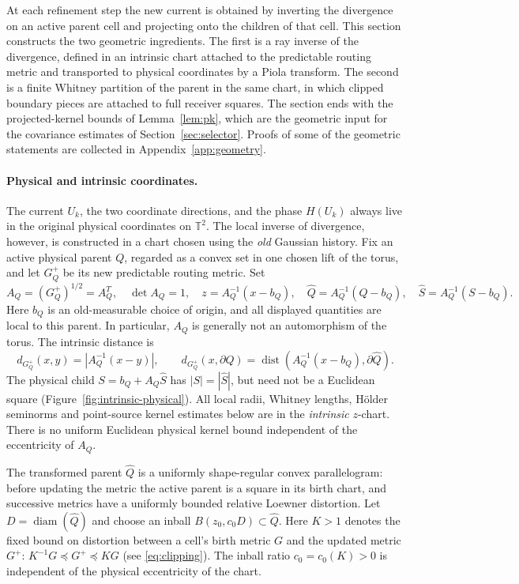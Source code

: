 \documentclass[11pt]{article}
\theoremstyle{definition}
\theoremstyle{remark}
\numberwithin{equation}{section}
\newcommand{\T}{\mathbb T}
\newcommand{\dist}{\operatorname{dist}}
\newcommand{\diam}{\operatorname{diam}}
\begin{document}
At each refinement step the new current is obtained by inverting the
divergence on an active parent cell and projecting onto the children of
that cell. This section constructs the two geometric ingredients. The
first is a ray inverse of the divergence, defined in an intrinsic chart
attached to the predictable routing metric and transported to physical
coordinates by a Piola transform. The second is a finite Whitney
partition of the parent in the same chart, in which clipped boundary
pieces are attached to full receiver squares. The section ends with
the projected-kernel bounds of Lemma~\ref{lem:pk}, which are the
geometric input for the covariance estimates of
Section~\ref{sec:selector}. Proofs of some of the geometric statements
are collected in Appendix~\ref{app:geometry}.

\paragraph{Physical and intrinsic coordinates.}
The current $U_k$, the two coordinate directions, and the phase $H(U_k)$
always live in the original physical coordinates on $\T^2$.
The local inverse of divergence, however, is constructed in a chart
chosen using the \emph{old} Gaussian history. Fix an active physical parent
$Q$, regarded as a convex set in one chosen lift of the torus, and let
$G_Q^+$ be its new predictable routing metric. Set
\begin{equation}\label{eq:intrinsicchart}
 A_Q=(G_Q^+)^{1/2}=A_Q^T,\quad \det A_Q=1,\quad
 z=A_Q^{-1}(x-b_Q),\quad
 \widehat Q=A_Q^{-1}(Q-b_Q),\quad
 \widehat S=A_Q^{-1}(S-b_Q).
\end{equation}
Here $b_Q$ is an old-measurable choice of origin, and all displayed
quantities are local to this parent. In particular, $A_Q$ is generally
not an automorphism of the torus. \label{not:intrinsicdistance}
The intrinsic distance is
\[
 d_{G_Q^+}(x,y)=|A_Q^{-1}(x-y)|,\qquad
 d_{G_Q^+}(x,\partial Q)=\dist(A_Q^{-1}(x-b_Q),\partial\widehat Q).
\]
The physical child $S=b_Q+A_Q\widehat S$ has $|S|=|\widehat S|$,
but need not be a Euclidean square (Figure~\ref{fig:intrinsic-physical}). All local radii, Whitney lengths,
H\"older seminorms and point-source kernel estimates below are in the
\emph{intrinsic} $z$-chart. There is no uniform Euclidean physical
kernel bound independent of the eccentricity of $A_Q$.

The transformed parent $\widehat Q$ is a uniformly shape-regular
convex parallelogram: before updating the metric the active parent is a
square in its birth chart, and successive metrics have a uniformly
bounded relative Loewner distortion. Let $D=\diam(\widehat Q)$ and
choose an inball $B(z_0,c_0D)\subset\widehat Q$.
\label{not:Kconstant}
Here $K>1$ denotes the fixed bound on distortion between a cell's
birth metric $G$ and the updated metric $G^+$:
$K^{-1}G\preceq G^+\preceq KG$ (see \eqref{eq:clipping}).
The inball ratio $c_0=c_0(K)>0$ is independent of the physical
eccentricity of the chart.
\end{document}
